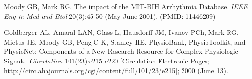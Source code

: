\documentclass{article} %
\begin{document}
\begin{thebibliography}{9}
Moody GB, Mark RG. The impact of the MIT-BIH Arrhythmia Database. \textit{IEEE Eng in Med and Biol} 20(3):45-50 (May-June 2001). (PMID: 11446209)
 
Goldberger AL, Amaral LAN, Glass L, Hausdorff JM, Ivanov PCh, Mark RG, Mietus JE, Moody GB, Peng C-K, Stanley HE. PhysioBank, PhysioToolkit, and PhysioNet: Components of a New Research Resource for Complex Physiologic Signals. \textit{Circulation} 101(23):e215-e220 [Circulation Electronic Pages; \url{http://circ.ahajournals.org/cgi/content/full/101/23/e215}]; 2000 (June 13).

\end{thebibliography}
\end{document}
